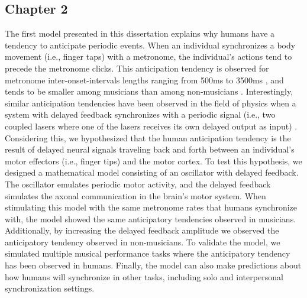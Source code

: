 \documentclass{report}
\begin{document}
\subsection{Chapter 2}
The first model presented in this dissertation explains why humans have a tendency to anticipate periodic events. When an individual synchronizes a body movement (i.e., finger taps) with a metronome, the individual's actions tend to precede the metronome clicks. This anticipation tendency is observed for metronome inter-onset-intervals lengths ranging from 500ms to 3500ms \cite{repp2005sensorimotor}, and tends to be smaller among musicians than among non-musicians \cite{repp2007tapping}. Interestingly, similar anticipation tendencies have been observed in the field of physics when a system with delayed feedback synchronizes with a periodic signal (i.e., two coupled lasers where one of the lasers receives its own delayed output as input) \cite{stepp2010strong}. Considering this, we hypothesized that the human anticipation tendency is the result of delayed neural signals traveling back and forth between an individual's motor effectors (i.e., finger tips) and the motor cortex. To test this hypothesis, we designed a mathematical model consisting of an oscillator with delayed feedback. The oscillator emulates periodic motor activity, and the delayed feedback simulates the axonal communication in the brain's motor system. When stimulating this model with the same metronome rates that humans synchronize with, the model showed the same anticipatory tendencies observed in musicians. Additionally, by increasing the delayed feedback amplitude we observed the anticipatory tendency observed in non-musicians. To validate the model, we simulated multiple musical performance tasks where the anticipatory tendency has been observed in humans. Finally, the model can also make predictions about how humans will synchronize in other tasks, including solo and interpersonal synchronization settings.
\end{document}
